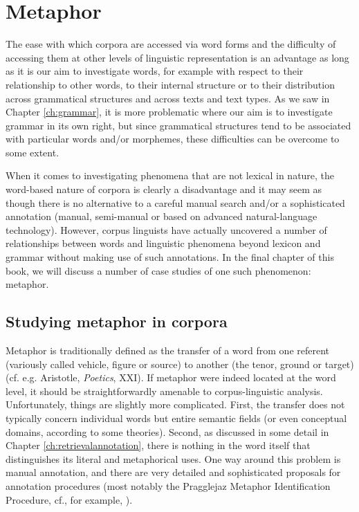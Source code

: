 \chapter{Metaphor}
\label{ch:metaphorandmetonymy}

The ease with which corpora are accessed via word forms and the difficulty of accessing them at other levels of linguistic representation is an advantage as long as it is our aim to investigate words, for example with respect to their relationship to other words, to their internal structure or to their distribution across grammatical structures and across texts and text types. As we saw in Chapter \ref{ch:grammar}, it is more problematic where our aim is to investigate grammar in its own right, but since grammatical structures tend to be associated with particular words and/or morphemes, these difficulties can be overcome to some extent.

When it comes to investigating phenomena that are not lexical in nature, the word-based nature of corpora is clearly a disadvantage and it may seem as though there is no alternative to a careful manual search and/or a sophisticated annotation (manual, semi-manual or based on advanced natural-language technology). However, corpus linguists have actually uncovered a number of relationships between words and linguistic phenomena beyond lexicon and grammar without making use of such annotations. In the final chapter of this book, we will discuss a number of case studies of one such phenomenon: metaphor.

\section{Studying metaphor in corpora}
\label{sec:studyingmetaphorincorpora}

Metaphor is traditionally defined as the transfer of a word from one referent (variously called vehicle, figure or source) to another (the tenor, ground or target) (cf. e.g. Aristotle, \textit{Poetics}, XXI). If metaphor were indeed located at the word level, it should be straightforwardly amenable to corpus-linguistic analysis. Unfortunately, things are slightly more complicated. First, the transfer does not typically concern individual words but entire semantic fields (or even conceptual domains, according to some theories). Second, as discussed in some detail in Chapter \ref{ch:retrievalannotation}, there is nothing in the word itself that distinguishes its literal and metaphorical uses. One way around this problem is manual annotation, and there are very detailed and sophisticated proposals for annotation procedures (most notably the Pragglejaz Metaphor Identification Procedure, cf., for example, \citet{low_pragglejaz_2010}).

